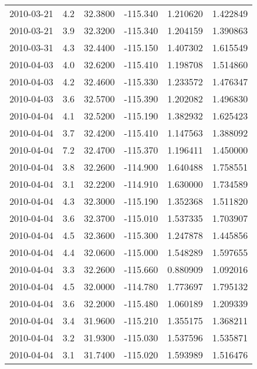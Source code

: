 \begin{tabular}{lrrrrr}
2010-03-21 &       4.2 &  32.3800 &  -115.340 &         1.210620 &         1.422849 \\
2010-03-21 &       3.9 &  32.3200 &  -115.340 &         1.204159 &         1.390863 \\
2010-03-31 &       4.3 &  32.4400 &  -115.150 &         1.407302 &         1.615549 \\
2010-04-03 &       4.0 &  32.6200 &  -115.410 &         1.198708 &         1.514860 \\
2010-04-03 &       4.2 &  32.4600 &  -115.330 &         1.233572 &         1.476347 \\
2010-04-03 &       3.6 &  32.5700 &  -115.390 &         1.202082 &         1.496830 \\
2010-04-04 &       4.1 &  32.5200 &  -115.190 &         1.382932 &         1.625423 \\
2010-04-04 &       3.7 &  32.4200 &  -115.410 &         1.147563 &         1.388092 \\
2010-04-04 &       7.2 &  32.4700 &  -115.370 &         1.196411 &         1.450000 \\
2010-04-04 &       3.8 &  32.2600 &  -114.900 &         1.640488 &         1.758551 \\
2010-04-04 &       3.1 &  32.2200 &  -114.910 &         1.630000 &         1.734589 \\
2010-04-04 &       4.3 &  32.3000 &  -115.190 &         1.352368 &         1.511820 \\
2010-04-04 &       3.6 &  32.3700 &  -115.010 &         1.537335 &         1.703907 \\
2010-04-04 &       4.5 &  32.3600 &  -115.300 &         1.247878 &         1.445856 \\
2010-04-04 &       4.4 &  32.0600 &  -115.000 &         1.548289 &         1.597655 \\
2010-04-04 &       3.3 &  32.2600 &  -115.660 &         0.880909 &         1.092016 \\
2010-04-04 &       4.5 &  32.0000 &  -114.780 &         1.773697 &         1.795132 \\
2010-04-04 &       3.6 &  32.2000 &  -115.480 &         1.060189 &         1.209339 \\
2010-04-04 &       3.4 &  31.9600 &  -115.210 &         1.355175 &         1.368211 \\
2010-04-04 &       3.2 &  31.9300 &  -115.030 &         1.537596 &         1.535871 \\
2010-04-04 &       3.1 &  31.7400 &  -115.020 &         1.593989 &         1.516476 \\

\end{tabular}
